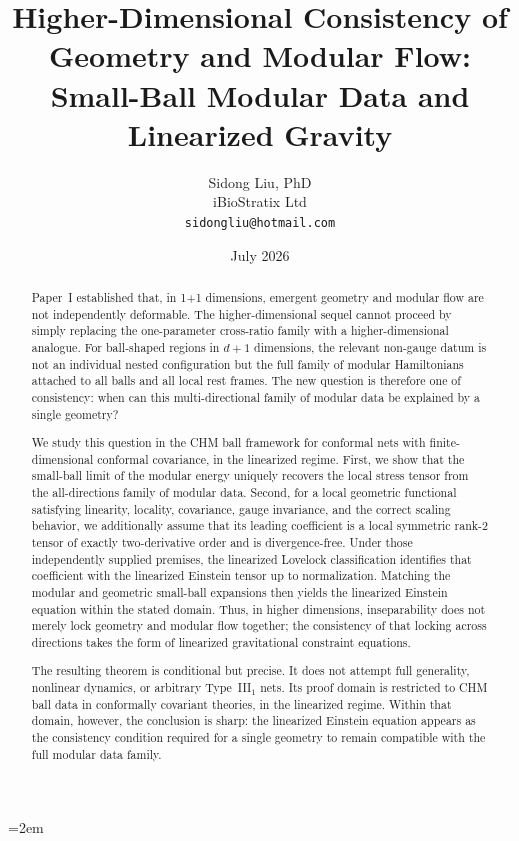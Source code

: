 \documentclass[12pt]{article}
\title{%
  \textbf{Higher-Dimensional Consistency of Geometry and Modular Flow:}\\
  \textbf{Small-Ball Modular Data and Linearized Gravity}%
}
\author{
  Sidong Liu, PhD \\
  \small iBioStratix Ltd \\
  \small \texttt{sidongliu@hotmail.com}
}
\date{July 2026}
\theoremstyle{definition}
\theoremstyle{remark}
\begin{document}
\emergencystretch=2em
\raggedbottom
{}

\maketitle

\begin{abstract}
Paper~I established that, in 1+1 dimensions, emergent geometry and
modular flow are not independently deformable. The higher-dimensional
sequel cannot proceed by simply replacing the one-parameter cross-ratio
family with a higher-dimensional analogue. For ball-shaped regions in
\(d+1\) dimensions, the relevant non-gauge datum is not an individual
nested configuration but the full family of modular Hamiltonians
attached to all balls and all local rest frames. The new question is
therefore one of consistency: when can this multi-directional family of
modular data be explained by a single geometry?

We study this question in the CHM ball framework for conformal nets with
finite-dimensional conformal covariance, in the linearized regime.
First, we show that the small-ball limit of the modular energy uniquely
recovers the local stress tensor from the all-directions family of
modular data. Second, for a local geometric functional satisfying
linearity, locality, covariance, gauge invariance, and the correct
scaling behavior, we additionally assume that its leading coefficient is
a local symmetric rank-2 tensor of exactly two-derivative order and is
divergence-free. Under those independently supplied premises, the
linearized Lovelock classification identifies that coefficient with the
linearized Einstein tensor up to normalization. Matching the modular and
geometric small-ball expansions then yields the linearized Einstein
equation within the stated domain. Thus, in higher dimensions,
inseparability does not merely lock geometry and modular flow together;
the consistency of that locking across directions takes the form of
linearized gravitational constraint equations.

The resulting theorem is conditional but precise. It does not attempt
full generality, nonlinear dynamics, or arbitrary Type~III$_1$ nets.
Its proof domain is restricted to CHM ball data in conformally covariant
theories, in the linearized regime. Within that domain, however, the
conclusion is sharp: the linearized Einstein equation appears as the
consistency condition required for a single geometry to remain
compatible with the full modular data family.
 \end{abstract}
\end{document}
